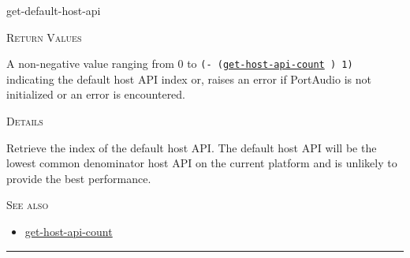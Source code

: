 \documentclass[a4paper]{report}
\begin{document}
    \label{portaudio__fun__get-default-host-api}
    \begin{defun}[Function]
    get-default-host-api


    
    \bigskip
    \textsc{Return Values}

A non-negative value ranging from 0 to \texttt{(- (\hyperref[portaudio__fun__get-host-api-count]{\texttt{get-host-api-count}}
  ) 1)} indicating the default host API index or, raises an error if PortAudio is not initialized or an error is encountered. 


	
    \bigskip
    \textsc{Details}

Retrieve the index of the default host API. The default host API will be the lowest common denominator host API on
 the current platform and is unlikely to provide the best performance.




      
    \bigskip
    \textsc{See also}


	
    \begin{itemize}
    
	  
    \item
    \hyperref[portaudio__fun__get-host-api-count]{get-host-api-count}
    
	
    \end{itemize}
  
      


    
    \end{defun}
  
  

    \rule{\linewidth}{0.1mm}
    
\end{document}
